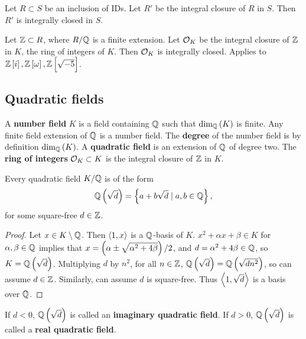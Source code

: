 \begin{theorem}
Let $ R \subset S $ be an inclusion of IDs. Let $ R' $ be the integral closure of $ R $ in $ S $. Then $ R' $ is integrally closed in $ S $.
\end{theorem}

\begin{example*}
Let $ \mathbb{Z} \subset R $, where $ R / \mathbb{Q} $ is a finite extension. Let $ \mathcal{O}_K $ be the integral closure of $ \mathbb{Z} $ in $ K $, the ring of integers of $ K $. Then $ \mathcal{O}_K $ is integrally closed. Applies to $ \Z\sbr{i}, \Z\sbr{\omega}, \Z\sbr{\sqrt{-5}} $.
\end{example*}

\pagebreak

\subsection{Quadratic fields}

A \textbf{number field} $ K $ is a field containing $ \mathbb{Q} $ such that $ \dim_\Q\br{K} $ is finite. Any finite field extension of $ \mathbb{Q} $ is a number field. The \textbf{degree} of the number field is by definition $ \dim_\Q\br{K} $. A \textbf{quadratic field} is an extension of $ \mathbb{Q} $ of degree two. The \textbf{ring of integers} $ \mathcal{O}_K \subset K $ is the integral closure of $ \mathbb{Z} $ in $ K $.

\begin{lemma}
Every quadratic field $ K / \mathbb{Q} $ is of the form
$$ \Q\br{\sqrt{d}} = \cbr{a + b\sqrt{d} \mid a, b \in \Q}, $$
for some square-free $ d \in \mathbb{Z} $.
\end{lemma}

\begin{proof}
Let $ x \in K \setminus \mathbb{Q} $. Then $ \left\langle 1, x \right\rangle $ is a $ \mathbb{Q} $-basis of $ K $. $ x^2 + \alpha x + \beta \in K $ for $ \alpha, \beta \in \mathbb{Q} $ implies that $ x = \br{\alpha \pm\sqrt{\alpha^2 + 4\beta}} / 2 $, and $ d = \alpha^2 + 4\beta \in \mathbb{Q} $, so $ K = \Q\br{\sqrt{d}} $. Multiplying $ d $ by $ n^2 $, for all $ n \in \mathbb{Z} $, $ \Q\br{\sqrt{d}} = \Q\br{\sqrt{dn^2}} $, so can assume $ d \in \mathbb{Z} $. Similarly, can assume $ d $ is square-free. Thus $ \left\langle 1, \sqrt{d} \right\rangle $ is a basis over $ \mathbb{Q} $.
\end{proof}

\begin{remark*}
If $ d < 0 $, $ \Q\br{\sqrt{d}} $ is called an \textbf{imaginary quadratic field}. If $ d > 0 $, $ \Q\br{\sqrt{d}} $ is called a \textbf{real quadratic field}.
\end{remark*}

